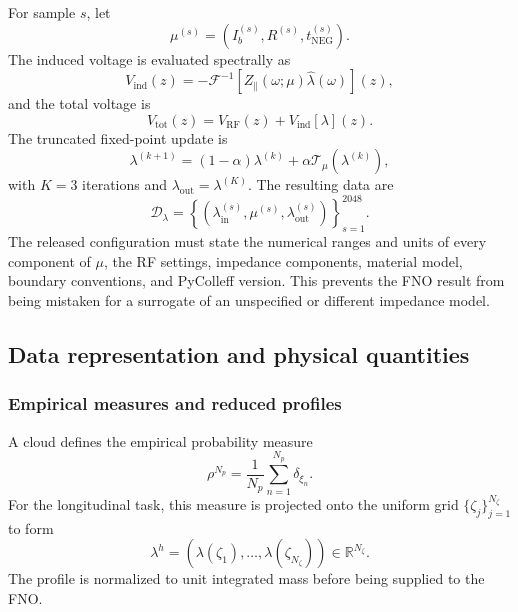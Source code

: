 For sample $s$, let
\begin{equation}
    \mu^{(s)}
    =
    \left(
        I_b^{(s)},
        R^{(s)},
        t_{\mathrm{NEG}}^{(s)}
    \right).
\end{equation}
The induced voltage is evaluated spectrally as
\begin{equation}
    V_{\mathrm{ind}}(z)
    =
    -\mathcal{F}^{-1}
    \left[
        Z_{\parallel}(\omega;\mu)
        \widehat{\lambda}(\omega)
    \right](z),
    \label{eq:induced_voltage_revised}
\end{equation}
and the total voltage is
\begin{equation}
    V_{\mathrm{tot}}(z)
    =
    V_{\mathrm{RF}}(z)
    +
    V_{\mathrm{ind}}[\lambda](z).
\end{equation}
The truncated fixed-point update is
\begin{equation}
    \lambda^{(k+1)}
    =
    (1-\alpha)\lambda^{(k)}
    +
    \alpha\mathcal{T}_{\mu}
    \!\left(\lambda^{(k)}\right),
    \label{eq:pycolleff_relaxation_revised}
\end{equation}
with $K=3$ iterations and $\lambda_{\mathrm{out}}=\lambda^{(K)}$. The resulting data are
\begin{equation}
    \mathcal{D}_{\lambda}
    =
    \left\{
        \left(
            \lambda_{\mathrm{in}}^{(s)},
            \mu^{(s)},
            \lambda_{\mathrm{out}}^{(s)}
        \right)
    \right\}_{s=1}^{2048}.
\end{equation}
The released configuration must state the numerical ranges and units of every component of $\mu$, the RF settings, impedance components, material model, boundary conventions, and PyColleff version. This prevents the FNO result from being mistaken for a surrogate of an unspecified or different impedance model.


\subsection{Data representation and physical quantities}
\label{subsec:data_representation_physical_quantities}

\subsubsection{Empirical measures and reduced profiles}

A cloud defines the empirical probability measure
\begin{equation}
    \rho^{N_p}
    =
    \frac{1}{N_p}
    \sum_{n=1}^{N_p}
    \delta_{\xi_n}.
\end{equation}
For the longitudinal task, this measure is projected onto the uniform grid $\{\zeta_j\}_{j=1}^{N_{\zeta}}$ to form
\begin{equation}
    \lambda^h
    =
    \left(
        \lambda(\zeta_1),\ldots,
        \lambda(\zeta_{N_{\zeta}})
    \right)
    \in
    \mathbb{R}^{N_{\zeta}}.
\end{equation}
The profile is normalized to unit integrated mass before being supplied to the FNO.

